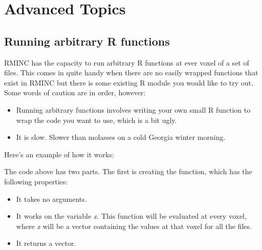 \chapter{Advanced Topics}

\section{Running arbitrary R functions}

RMINC has the capacity to run arbitrary R functions at ever voxel of a
set of files. This comes in quite handy when there are no easily
wrapped functions that exist in RMINC but there is some existing R
module you would like to try out. Some words of caution are in order,
however:

\begin{itemize}
\item Running arbitrary functions involves writing your own small R
  function to wrap the code you want to use, which is a bit ugly.
\item It is slow. Slower than molasses on a cold Georgia winter
  morning.
\end{itemize}

Here's an example of how it works:


The code above has two parts. The first is creating the function,
which has the following properties:

\begin{itemize}
\item It takes no arguments.
\item It works on the variable \textit{x}. This function will be
  evaluated at every voxel, where \textit{x} will be a vector
  containing the values at that voxel for all the files.
\item It returns a vector.
\end{itemize}
